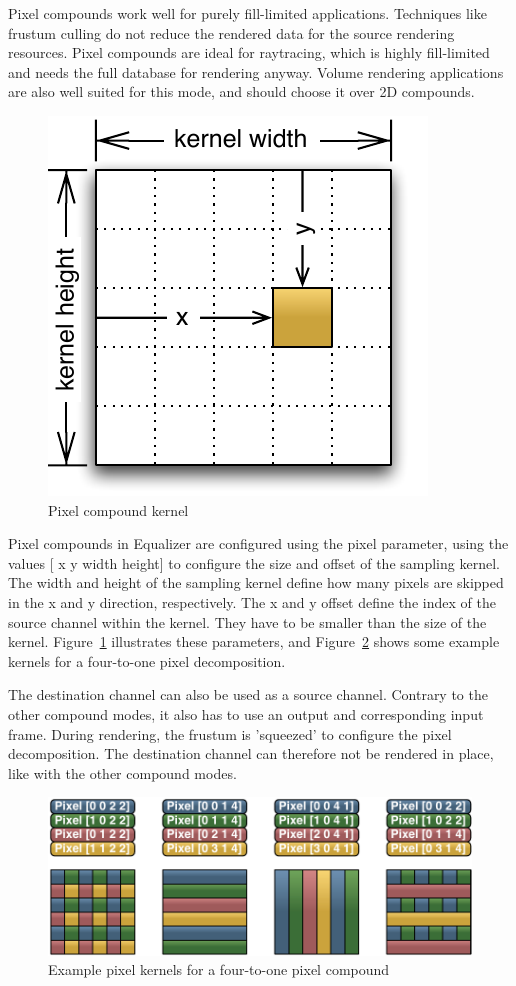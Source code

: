 \documentclass[10pt,a4]{scrartcl}
\newcommand{\fig}[1]{Figure~\ref{#1}}
\begin{document}
Pixel compounds work well for purely fill-limited applications.
Techniques like frustum culling do not reduce the rendered data for the
source rendering resources. Pixel compounds are ideal for raytracing,
which is highly fill-limited and needs the full database for rendering
anyway. Volume rendering applications are also well suited for this
mode, and should choose it over 2D compounds.

\begin{figure}
  \includegraphics[width=.382\textwidth]{images/pixelKernel.pdf}
  {\caption{\label{fPixelKernel}\small Pixel compound kernel}}
\end{figure}
Pixel compounds in Equalizer are configured using the \textsf{pixel}
parameter, using the values \textsf{[ x y width height]}  to configure
the size and offset of the sampling kernel. The width and height of the
sampling kernel define how many pixels are skipped in the x and y
direction, respectively. The x and y offset define the index of the
source channel within the kernel. They have to be smaller than the size
of the kernel. \fig{fPixelKernel} illustrates these parameters, and
\fig{fPixelKernels} shows some example kernels for a four-to-one pixel decomposition.

The destination channel can also be used as a source channel. Contrary
to the other compound modes, it also has to use an output and
corresponding input frame. During rendering, the frustum is 'squeezed'
to configure the pixel decomposition. The destination channel can
therefore not be rendered in place, like with the other compound modes.
\begin{figure}[ht!]\center
  \includegraphics[width=.9\textwidth]{images/pixelKernels.pdf}
  {\caption{\label{fPixelKernels}Example pixel kernels for a
      four-to-one pixel compound}}
\end{figure}
\end{document}
